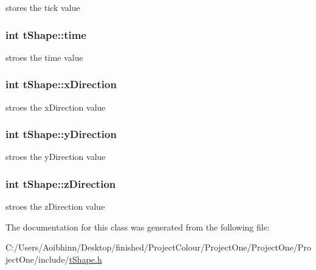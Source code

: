 stores the tick value \hypertarget{classt_shape_a959bedb9443f8d99092fe7e249354068}{
\subsubsection[{time}]{\setlength{\rightskip}{0pt plus 5cm}int t\-Shape\-::time}}\label{classt_shape_a959bedb9443f8d99092fe7e249354068}
stroes the time value \hypertarget{classt_shape_a7d7596d539b46bd0cf0935a1b49c025f}{
\subsubsection[{x\-Direction}]{\setlength{\rightskip}{0pt plus 5cm}int t\-Shape\-::x\-Direction}}\label{classt_shape_a7d7596d539b46bd0cf0935a1b49c025f}
stroes the x\-Direction value \hypertarget{classt_shape_a5049442ea1c882642d58bc384666a9d7}{
\subsubsection[{y\-Direction}]{\setlength{\rightskip}{0pt plus 5cm}int t\-Shape\-::y\-Direction}}\label{classt_shape_a5049442ea1c882642d58bc384666a9d7}
stroes the y\-Direction value \hypertarget{classt_shape_a5f192d399b118e50bf47c48f3acbd74c}{
\subsubsection[{z\-Direction}]{\setlength{\rightskip}{0pt plus 5cm}int t\-Shape\-::z\-Direction}}\label{classt_shape_a5f192d399b118e50bf47c48f3acbd74c}
stroes the z\-Direction value 

The documentation for this class was generated from the following file\-:\begin{DoxyCompactItemize}
\item 
C\-:/\-Users/\-Aoibhinn/\-Desktop/finished/\-Project\-Colour/\-Project\-One/\-Project\-One/\-Project\-One/include/\hyperlink{t_shape_8h}{t\-Shape.\-h}\end{DoxyCompactItemize}
